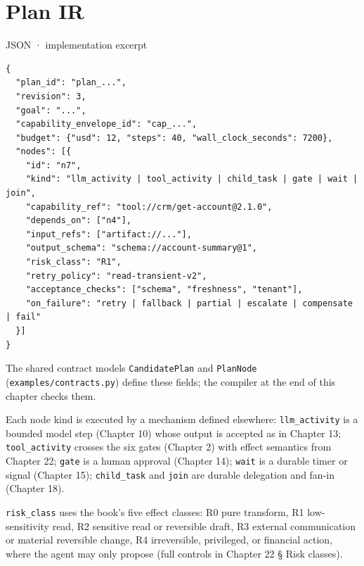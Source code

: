 \section{Plan IR}

JSON · implementation excerpt\par

\needspace{194.8pt}
\begin{lstlisting}[style=bookcode,title={JSON},language=bookjson]
{
  "plan_id": "plan_...",
  "revision": 3,
  "goal": "...",
  "capability_envelope_id": "cap_...",
  "budget": {"usd": 12, "steps": 40, "wall_clock_seconds": 7200},
  "nodes": [{
    "id": "n7",
    "kind": "llm_activity | tool_activity | child_task | gate | wait | join",
    "capability_ref": "tool://crm/get-account@2.1.0",
    "depends_on": ["n4"],
    "input_refs": ["artifact://..."],
    "output_schema": "schema://account-summary@1",
    "risk_class": "R1",
    "retry_policy": "read-transient-v2",
    "acceptance_checks": ["schema", "freshness", "tenant"],
    "on_failure": "retry | fallback | partial | escalate | compensate | fail"
  }]
}
\end{lstlisting}

The shared contract models \lstinline[style=bookinline]!CandidatePlan! and \lstinline[style=bookinline]!PlanNode! (\lstinline[style=bookinline]!examples/contracts.py!) define these fields; the compiler at the end of this chapter checks them.\par

Each node kind is executed by a mechanism defined elsewhere: \lstinline[style=bookinline]!llm_activity! is a bounded model step (Chapter 10) whose output is accepted as in Chapter 13; \lstinline[style=bookinline]!tool_activity! crosses the six gates (Chapter 2) with effect semantics from Chapter 22; \lstinline[style=bookinline]!gate! is a human approval (Chapter 14); \lstinline[style=bookinline]!wait! is a durable timer or signal (Chapter 15); \lstinline[style=bookinline]!child_task! and \lstinline[style=bookinline]!join! are durable delegation and fan-in (Chapter 18).\par

\lstinline[style=bookinline]!risk_class! uses the book's five effect classes: R0 pure transform, R1 low-sensitivity read, R2 sensitive read or reversible draft, R3 external communication or material reversible change, R4 irreversible, privileged, or financial action, where the agent may only propose (full controls in Chapter 22 § Risk classes).\par

